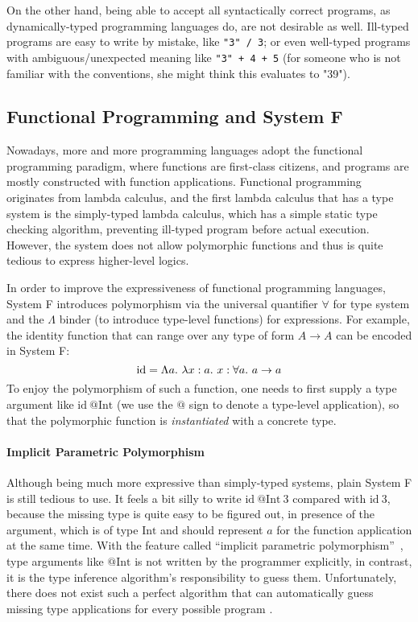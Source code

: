 On the other hand, being able to accept all syntactically correct programs,
as dynamically-typed programming languages do,
are not desirable as well.
Ill-typed programs are easy to write by mistake, like \verb|"3" / 3|;
or even well-typed programs with ambiguous/unexpected meaning like \verb|"3" + 4 + 5|
(for someone who is not familiar with the conventions, she might think this evaluates to "39").


\subsection{Functional Programming and System F}
Nowadays, more and more programming languages adopt the functional programming paradigm,
where functions are first-class citizens,
and programs are mostly constructed with function applications.
Functional programming originates from lambda calculus,
and the first lambda calculus that has a type system is the
simply-typed lambda calculus, which has a simple static type checking algorithm,
preventing ill-typed program before actual execution.
However, the system does not allow polymorphic functions and
thus is quite tedious to express higher-level logics.

In order to improve the expressiveness of functional programming languages,
System F introduces polymorphism via the universal quantifier $\forall$ for type system
and the $\Lambda$ binder (to introduce type-level functions) for expressions.
For example, the identity function that can range over any type of form $A \to A$
can be encoded in System F:
$$\text{id} = \Lambda a.~\lam[x:a]x : \all a \to a$$
To enjoy the polymorphism of such a function,
one needs to first supply a type argument like $\text{id}~@\text{Int}$
(we use the $@$ sign to denote a type-level application),
so that the polymorphic function is \emph{instantiated} with
a concrete type.

\paragraph{Implicit Parametric Polymorphism}

Although being much more expressive than simply-typed systems,
plain System F is still tedious to use.
It feels a bit silly to write $\text{id}~@\text{Int}~3$ compared with $\text{id}~3$,
because the missing type is quite easy to be figured out,
in presence of the argument, which is of type $\text{Int}$ and
should represent $a$ for the function application at the same time.
With the feature called ``implicit parametric polymorphism''~\citet{reynolds1983types},
type arguments like $@\text{Int}$ is not written by the programmer explicitly,
in contrast, it is the type inference algorithm's responsibility to guess them.
Unfortunately, there does not exist such a perfect algorithm that
can automatically guess missing type applications for every possible program .

